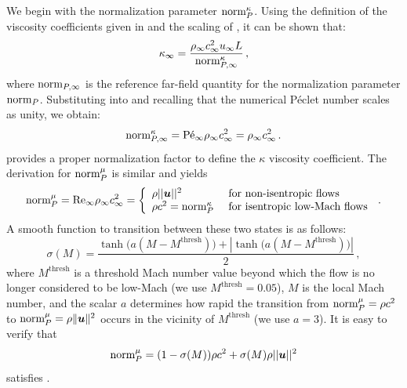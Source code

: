 We begin with the  normalization parameter $\textrm{norm}_P^\kappa$. Using the 
definition of the viscosity coefficients given in  and the scaling of 
, it can be shown that:
%
\begin{equation}
\label{eq:norm_relation}
\kappa_\infty = \frac{ \rho_\infty c_\infty^2 u_\infty L }{ \textrm{norm}_{P,\infty}^{\kappa} } \, ,
\end{equation}
%
where $\textrm{norm}_{P,\infty}$ is the reference far-field quantity for the normalization parameter $\textrm{norm}_P$. 
Substituting  into  and recalling that the numerical P\'eclet 
number scales as unity, we obtain:
%
\begin{equation}
\label{eq:norm_relation_bis}
\textrm{norm}_{P,\infty}^{\kappa} = \textrm{P\'e}_\infty \rho_\infty c_\infty^2 = \rho_\infty c_\infty^2 \, .
\end{equation}
%
 provides a proper normalization factor to define the $\kappa$ viscosity coefficient.
%
The derivation for $\textrm{norm}_P^\mu$ is similar and yields
\begin{equation}
\label{eq:norm_ent2}
\textrm{norm}_P^\mu = \textrm{Re}_\infty \rho_\infty c_\infty^2 =  \left\{
\begin{array}{ll}
 \rho ||\boldsymbol u ||^2       & \text{ for non-isentropic flows} \\
 \rho c^2 = \textrm{norm}_P^\kappa & \text{ for isentropic low-Mach flows}
\end{array}
\right. \,.
\end{equation}
A smooth function to transition between these two states is as follows: %
\begin{equation}
\label{eq:sigma_fct}
 \sigma(M) = \frac{\tanh\big(a(M-M^\text{thresh})\big) + | \tanh\big(a(M-M^\text{thresh})\big) | }{2} \,,
\end{equation}
where $M^\text{thresh}$ is a threshold Mach number value beyond which the flow is no longer 
considered  to be low-Mach (we use $M^\text{thresh}=0.05$), $M$ is the local Mach number, 
and the scalar $a$ determines how rapid the transition from  
$\textrm{norm}_P^\mu= \rho c^2$ to $\textrm{norm}_P^\mu=\rho \| \boldsymbol u\|^2$ occurs in the vicinity of $M^\text{thresh}$ (we use $a = 3$). 
It is easy to verify that
\begin{equation}
\label{eq:norm_ent3}
\textrm{norm}_P^\mu = (1-\sigma(M)) \rho c^2  + \sigma(M)  \rho ||\boldsymbol u ||^2  
\end{equation}
satisfies .

